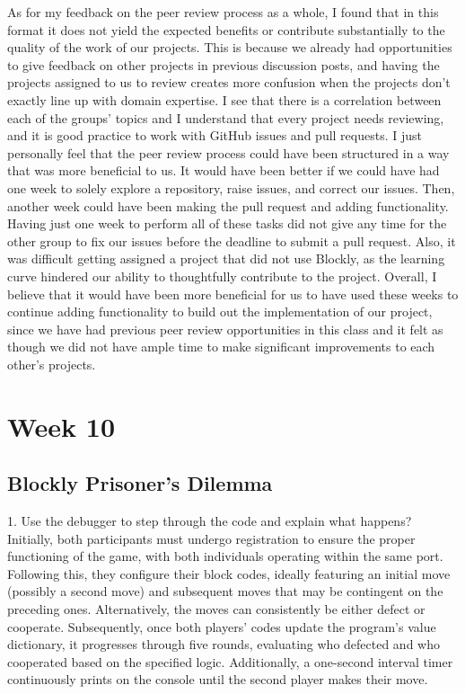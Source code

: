 \documentclass{article}
\theoremstyle{theorem}
\theoremstyle{definition}
\theoremstyle{remark}
\begin{document}
As for my feedback on the peer review process as a whole, I found that in this format it does not yield the expected benefits or contribute substantially to the quality of the work of our projects. This is because we already had opportunities to give feedback on other projects in previous discussion posts, and having the projects assigned to us to review creates more confusion when the projects don't exactly line up with domain expertise. I see that there is a correlation between each of the groups' topics and I understand that every project needs reviewing, and it is good practice to work with GitHub issues and pull requests. I just personally feel that the peer review process could have been structured in a way that was more beneficial to us. It would have been better if we could have had one week to solely explore a repository, raise issues, and correct our issues. Then, another week could have been making the pull request and adding functionality. Having just one week to perform all of these tasks did not give any time for the other group to fix our issues before the deadline to submit a pull request. Also, it was difficult getting assigned a project that did not use Blockly, as the learning curve hindered our ability to thoughtfully contribute to the project. Overall, I believe that it would have been more beneficial for us to have used these weeks to continue adding functionality to build out the implementation of our project, since we have had previous peer review opportunities in this class and it felt as though we did not have ample time to make significant improvements to each other's projects. 

\section{Week 10}

\subsection{Blockly Prisoner's Dilemma}

1. Use the debugger to step through the code and explain what happens? \\

Initially, both participants must undergo registration to ensure the proper functioning of the game, with both individuals operating within the same port. Following this, they configure their block codes, ideally featuring an initial move (possibly a second move) and subsequent moves that may be contingent on the preceding ones. Alternatively, the moves can consistently be either defect or cooperate. Subsequently, once both players' codes update the program's value dictionary, it progresses through five rounds, evaluating who defected and who cooperated based on the specified logic. Additionally, a one-second interval timer continuously prints on the console until the second player makes their move. \\
\end{document}
